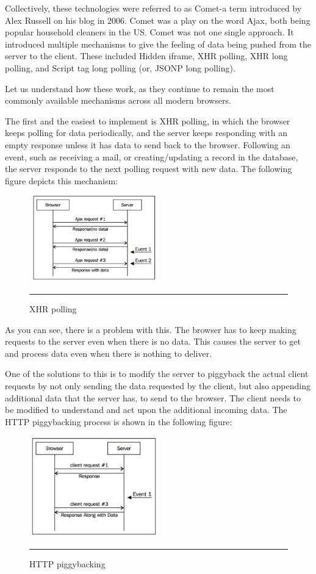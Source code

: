 Collectively, these technologies were referred to as Comet-a term introduced by Alex
Russell on his blog in 2006. Comet was a play on the word Ajax, both being popular
household cleaners in the US. Comet was not one single approach. It introduced
multiple mechanisms to give the feeling of data being pushed from the server to the
client. These included Hidden iframe, XHR polling, XHR long polling, and Script tag
long polling (or, JSONP long polling).\cite{15}

Let us understand how these work, as they continue to remain the most commonly
available mechanisms across all modern browsers.

The first and the easiest to implement is XHR polling, in which the browser keeps
polling for data periodically, and the server keeps responding with an empty
response unless it has data to send back to the browser. Following an event, such
as receiving a mail, or creating/updating a record in the database, the server
responds to the next polling request with new data. The following figure depicts
this mechanism:
\begin{figure}[h!]
  \centering
    \includegraphics[width=0.5\textwidth]{./Pictures/xhr.jpg}
  \rule{0.5\textwidth}{1pt}
  \caption{XHR polling}
\end{figure}
As you can see, there is a problem with this. The browser has to keep making
requests to the server even when there is no data. This causes the server to get and
process data even when there is nothing to deliver.\cite{15}

One of the solutions to this is to modify the server to piggyback the actual client
requests by not only sending the data requested by the client, but also appending
additional data that the server has, to send to the browser. The client needs to be
modified to understand and act upon the additional incoming data. The HTTP
piggybacking process is shown in the following figure:
\begin{figure}[h!]
  \centering
    \includegraphics[width=0.5\textwidth]{./Pictures/http_2.jpg}
  \rule{0.5\textwidth}{1pt}
  \caption{HTTP piggybacking}
\end{figure}

